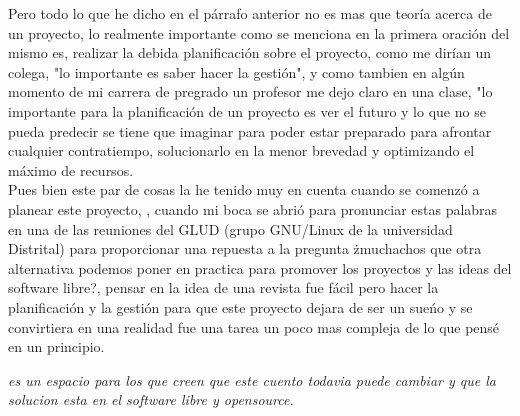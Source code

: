 \begin{multicols}{2}



\vspace{2mm}


Pero todo lo que he dicho en el párrafo anterior no es mas que teoría 
acerca de un proyecto, lo realmente importante como se menciona en la 
primera oración del mismo es, realizar la debida planificación sobre 
el proyecto, como me dirían un colega, "lo importante es saber hacer 
la gestión", y como tambien en algún momento de mi carrera de pregrado un profesor 
me dejo claro en una clase, "lo importante para la planificación de un 
proyecto es ver el futuro y lo que no se pueda predecir se tiene que 
imaginar para poder estar preparado para afrontar cualquier contratiempo, 
solucionarlo en la menor brevedad y optimizando el máximo de recursos.\\
Pues bien este par de cosas la he tenido muy en cuenta cuando se comenzó 
a planear este proyecto, {\em {\color{introcolor}{una revista}}}, cuando mi boca se abrió para 
pronunciar estas palabras en una de las reuniones del GLUD 
(grupo GNU/Linux de la universidad Distrital) para proporcionar una 
repuesta a la pregunta żmuchachos que otra alternativa podemos poner en 
practica para promover los proyectos y las ideas del software libre?, 
pensar en la idea de una revista fue fácil pero hacer la planificación y 
la gestión para que este proyecto dejara de ser un sueńo y se convirtiera 
en una realidad fue una tarea un poco mas compleja de lo que pensé en un 
principio.\\

\begin{entradilla}
{\em {\color{introcolor}{GLUD Magazine}} es un espacio para los que creen
que este cuento todavia puede cambiar y que la solucion esta en el software
libre y opensource.}
\end{entradilla}



\end{multicols}
